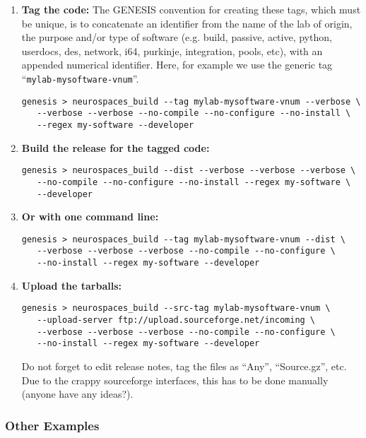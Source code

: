 \documentclass[12pt]{article}
\begin{document}
\begin{enumerate}

\item {\bf Tag the code:} The GENESIS convention for creating these tags, which must be unique, is to concatenate an identifier from the name of the lab of origin, the purpose and/or type of software (e.g. build, passive, active, python, userdocs, des, network, i64, purkinje, integration, pools, etc), with an appended numerical identifier. Here, for example we use the generic tag ``{\tt mylab-mysoftware-vnum}''.
\begin{verbatim}
genesis > neurospaces_build --tag mylab-mysoftware-vnum --verbose \
   --verbose --verbose --no-compile --no-configure --no-install \
   --regex my-software --developer
\end{verbatim}

\item {\bf Build the release for the tagged code:}
\begin{verbatim}
genesis > neurospaces_build --dist --verbose --verbose --verbose \
   --no-compile --no-configure --no-install --regex my-software \
   --developer
\end{verbatim}

\item {\bf Or with one command line:}
\begin{verbatim}
genesis > neurospaces_build --tag mylab-mysoftware-vnum --dist \
   --verbose --verbose --verbose --no-compile --no-configure \
   --no-install --regex my-software --developer
\end{verbatim}

\item {\bf Upload the tarballs:}
\begin{verbatim}
genesis > neurospaces_build --src-tag mylab-mysoftware-vnum \
   --upload-server ftp://upload.sourceforge.net/incoming \
   --verbose --verbose --verbose --no-compile --no-configure \
   --no-install --regex my-software --developer
\end{verbatim}
Do not forget to edit release notes, tag the files as ``Any'', ``Source.gz'', etc. Due to the crappy sourceforge interfaces, this has to be done manually (anyone have any ideas?).

\end{enumerate}

\subsubsection*{Other Examples}
\end{document}
